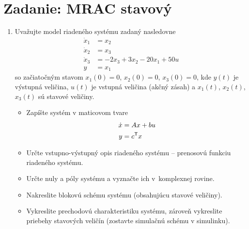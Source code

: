\documentclass[a4paper, 10pt, ]{article}
\begin{document}
\section{Zadanie: MRAC stavový}
\label{cvicsieste}




\begin{enumerate}[leftmargin=0pt, labelsep=4mm, itemsep=0pt]

    \item Uvažujte model riadeného systému zadaný nasledovne
    \begin{subequations} \label{system3radu}
    \begin{align}
    	\dot{x}_1 &= x_2   \\
    	\dot{x}_2 &= x_3   \\
    	\dot{x}_3 &= -2 x_3 + 3 x_2 - 20 x_1 + 50 u  \\
    	y &= x_1
    \end{align}
    \end{subequations}
    so začiatočným stavom $x_1(0)=0$, $x_2(0)=0$, $x_3(0)=0$, kde $y(t)$ je výstupná veličina, $u(t)$ je vstupná veličina (akčný zásah) a $x_1(t)$, $x_2(t)$, $x_3(t)$ sú stavové veličiny.

    \begin{itemize}[leftmargin=0pt, labelsep=4mm, itemsep=0pt]

    \item Zapíšte systém v maticovom tvare
    \begin{subequations}
        \begin{align}
        	 \dot x &= A x + b u \\
        	 y &= c^{\mathsf{T}} x
        \end{align}
    \end{subequations}


    \item Určte vstupno-výstupný opis riadeného systému -- prenosovú funkciu riadeného systému.
    \item Určte nuly a póly systému a vyznačte ich v~komplexnej rovine.
    \item Nakreslite blokovú schému systému (obsahujúcu stavové veličiny).
    \item Vykreslite prechodovú charakteristiku systému, zároveň vykreslite priebehy stavových veličín (zostavte simulačnú schému v simulinku).

    \end{itemize}



\end{enumerate}
\end{document}
